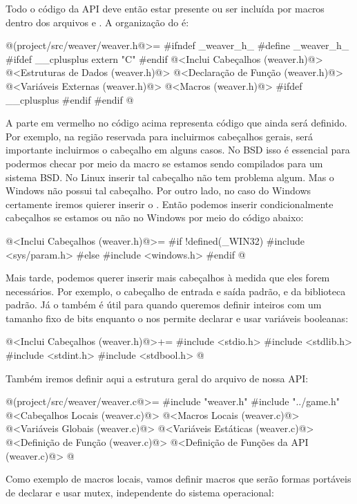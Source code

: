 Todo o código da API deve então estar presente ou ser incluída por
macros dentro dos arquivos 
e . A organização do  é:

\iniciocodigo
@(project/src/weaver/weaver.h@>=
#ifndef _weaver_h_
#define _weaver_h_
#ifdef __cplusplus
  extern "C" {
#endif
@<Inclui Cabeçalhos (weaver.h)@>
@<Estruturas de Dados (weaver.h)@>
@<Declaração de Função (weaver.h)@>
@<Variáveis Externas (weaver.h)@>
@<Macros (weaver.h)@>
#ifdef __cplusplus
  }
#endif
#endif
@
\fimcodigo

A parte em vermelho no código acima representa código que ainda será
definido. Por exemplo, na região reservada para incluirmos cabeçalhos
gerais, será importante incluirmos o
cabeçalho  em alguns casos. No BSD isso é
essencial para podermos checar por meio da macro se estamos sendo
compilados para um sistema BSD. No Linux inserir tal cabeçalho não tem
problema algum. Mas o Windows não possui tal cabeçalho. Por outro
lado, no caso do Windows certamente iremos quierer inserir
o . Então podemos inserir condicionalmente
cabeçalhos se estamos ou não no Windows por meio do código abaixo:

\iniciocodigo
@<Inclui Cabeçalhos (weaver.h)@>=
#if !defined(_WIN32)
#include <sys/param.h>
#else
#include <windows.h>
#endif
@
\fimcodigo

Mais tarde, podemos querer inserir mais cabeçalhos à medida que eles
forem necessários. Por exemplo, o cabeçalho de entrada e saída padrão,
e da biblioteca padrão. Já o  também é útil para
quando queremos definir inteiros com um tamanho fixo de bits enquanto
o  nos permite declarar e usar variáveis
booleanas:

\iniciocodigo
@<Inclui Cabeçalhos (weaver.h)@>+=
#include <stdio.h>
#include <stdlib.h>
#include <stdint.h>
#include <stdbool.h>
@
\fimcodigo

Também iremos definir aqui a estrutura geral do
arquivo  de nossa API:

\iniciocodigo
@(project/src/weaver/weaver.c@>=
#include "weaver.h"
#include "../game.h"
@<Cabeçalhos Locais (weaver.c)@>
@<Macros Locais (weaver.c)@>
@<Variáveis Globais (weaver.c)@>
@<Variáveis Estáticas (weaver.c)@>
@<Definição de Função (weaver.c)@>
@<Definição de Funções da API (weaver.c)@>
@
\fimcodigo

Como exemplo de macros locais, vamos definir macros que serão formas
portáveis de declarar e usar mutex, independente do sistema
operacional:

